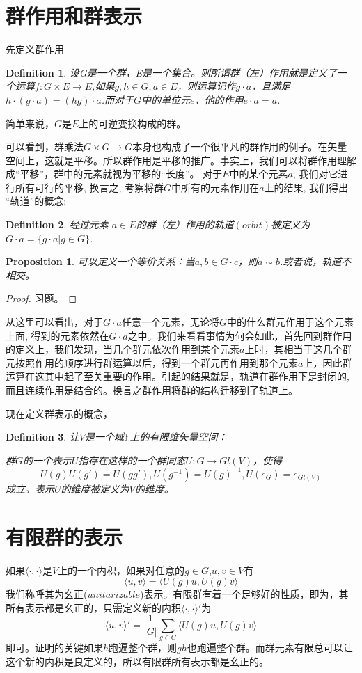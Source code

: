 \documentclass[11pt,a4paper,openany]{book}%
\theoremstyle{plain}%
\newtheorem{pro}{Proposition}[chapter]%
\newtheorem{defi}{Definition}[chapter]%
\begin{document}
\section{群作用和群表示}
先定义群作用
\begin{defi}
设G是一个群，E是一个集合。则所谓群（左）作用就是定义了一个运算$f:G\times E \rightarrow E$,如果$g,h \in G,a \in E$，则运算记作$g\cdot a$，且满足$h\cdot(g\cdot a)=(hg)\cdot a$.而对于$G$中的单位元$e$，他的作用$e\cdot a=a$.
\end{defi}
简单来说，$G$是$E$上的可逆变换构成的群。

可以看到，群乘法$G\times G \rightarrow G$本身也构成了一个很平凡的群作用的例子。在矢量空间上，这就是平移。所以群作用是平移的推广。事实上，我们可以将群作用理解成“平移”，群中的元素就视为平移的“长度”。 对于$E$中的某个元素$a$, 我们对它进行所有可行的平移, 换言之, 考察将群$G$中所有的元素作用在$a$上的结果, 我们得出 “轨道”的概念:
\begin{defi}
 经过元素 $a\in E$的群（左）作用的轨道$(orbit)$被定义为$G\cdot a=\{g\cdot a|g\in G\}$.
\end{defi}
\begin{pro}
可以定义一个等价关系：当$a,b \in G\cdot c$，则$a\sim b$.或者说，轨道不相交。
\end{pro}
\begin{proof}
习题。
\end{proof}
从这里可以看出，对于$G\cdot a$任意一个元素，无论将$G$中的什么群元作用于这个元素上面, 得到的元素依然在$G\cdot a$之中。我们来看看事情为何会如此，首先回到群作用的定义上，我们发现，当几个群元依次作用到某个元素$a$上时，其相当于这几个群元按照作用的顺序进行群运算以后，得到一个群元再作用到那个元素$a$上，因此群运算在这其中起了至关重要的作用。引起的结果就是，轨道在群作用下是封闭的, 而且连续作用是结合的。换言之群作用将群的结构迁移到了轨道上。

现在定义群表示的概念，
\begin{defi}
让$V$是一个域$\mathbb{F}$上的有限维矢量空间：

群$G$的一个表示$U$指存在这样的一个群同态$U:G\rightarrow Gl(V)$，使得
\[
U(g)U(g')=U(gg'),U(g^{-1})=U(g)^{-1},U(e_G)=e_{Gl(V)}
\]
成立。表示$U$的维度被定义为$V$的维度。
\end{defi}
\section{有限群的表示}
如果$\langle\cdot,\cdot\rangle$是$V$上的一个内积，如果对任意的$g\in G$,$u,v\in V$有
\[
\langle u,v \rangle=\langle U(g)u,U(g)v \rangle
\]
我们称呼其为幺正($unitarizable$)表示。有限群有着一个足够好的性质，即为，其所有表示都是幺正的，只需定义新的内积$\langle \cdot,\cdot \rangle'$为
\[
\langle u,v \rangle'=\frac{1}{|G|}\sum_{g\in G} \langle U(g)u,U(g)v \rangle
\]
即可。证明的关键如果$h$跑遍整个群，则$gh$也跑遍整个群。而群元素有限总可以让这个新的内积是良定义的，所以有限群所有表示都是幺正的。
\end{document}
